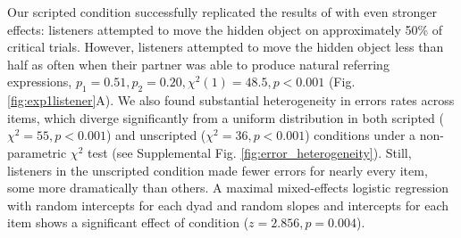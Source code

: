\documentclass[manuscript]{stjour}
\begin{document}
Our scripted condition successfully replicated the results of \cite{KeysarLinBarr03_LimitsOnTheoryOfMindUse} with even stronger effects: listeners attempted to move the hidden object on approximately 50\% of critical trials. However, listeners attempted to move the hidden object less than half as often when their partner was able to produce natural referring expressions, $p_1 = 0.51, p_2 = 0.20, \chi^2(1) = 48.5, p < 0.001$ (Fig. \ref{fig:exp1listener}A). We also found substantial heterogeneity in errors rates across items, which diverge significantly from a uniform distribution in both scripted ($\chi^2=55, p < 0.001$) and unscripted ($\chi^2=36, p <0.001$) conditions under a non-parametric $\chi^2$ test (see Supplemental Fig. \ref{fig:error_heterogeneity}). Still, listeners in the unscripted condition made fewer errors for nearly every item, some more dramatically than others. A maximal mixed-effects logistic regression with random intercepts for each dyad and random slopes and intercepts for each item shows a significant effect of condition ($z = 2.856, p = 0.004$). %

\end{document}
